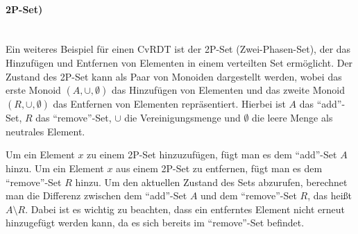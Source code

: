 \documentclass[../vs-script-first-v01.tex]{subfiles}
\begin{document}
\paragraph{2P-Set)}\mbox{}\\
Ein weiteres Beispiel für einen CvRDT ist der 2P-Set (Zwei-Phasen-Set), der das Hinzufügen und Entfernen von Elementen in einem verteilten Set ermöglicht. Der Zustand des 2P-Set kann als Paar von Monoiden dargestellt werden, wobei das erste Monoid $(A, \cup, \emptyset)$ das Hinzufügen von Elementen und das zweite Monoid $(R, \cup, \emptyset)$ das Entfernen von Elementen repräsentiert. Hierbei ist $A$ das \enquote{add}-Set, $R$ das \enquote{remove}-Set, $\cup$ die Vereinigungsmenge und $\emptyset$ die leere Menge als neutrales Element.

Um ein Element $x$ zu einem 2P-Set hinzuzufügen, fügt man es dem \enquote{add}-Set $A$ hinzu. Um ein Element $x$ aus einem 2P-Set zu entfernen, fügt man es dem \enquote{remove}-Set $R$ hinzu. Um den aktuellen Zustand des Sets abzurufen, berechnet man die Differenz zwischen dem \enquote{add}-Set $A$ und dem \enquote{remove}-Set $R$, das heißt $A \setminus R$. Dabei ist es wichtig zu beachten, dass ein entferntes Element nicht erneut hinzugefügt werden kann, da es sich bereits im \enquote{remove}-Set befindet.
\end{document}
